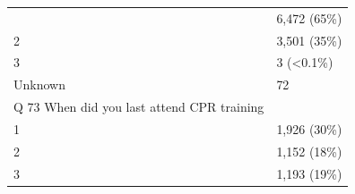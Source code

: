 \documentclass[]{article}
\begin{document}
\begin{longtable}[]{@{}ll@{}}
\begin{minipage}[t]{0.71\columnwidth}
\end{minipage} & \begin{minipage}[t]{0.23\columnwidth}\raggedright
6,472 (65\%)\strut
\end{minipage}\tabularnewline
\begin{minipage}[t]{0.71\columnwidth}\raggedright
2\strut
\end{minipage} & \begin{minipage}[t]{0.23\columnwidth}\raggedright
3,501 (35\%)\strut
\end{minipage}\tabularnewline
\begin{minipage}[t]{0.71\columnwidth}\raggedright
3\strut
\end{minipage} & \begin{minipage}[t]{0.23\columnwidth}\raggedright
3 (\textless0.1\%)\strut
\end{minipage}\tabularnewline
\begin{minipage}[t]{0.71\columnwidth}\raggedright
Unknown\strut
\end{minipage} & \begin{minipage}[t]{0.23\columnwidth}\raggedright
72\strut
\end{minipage}\tabularnewline
\begin{minipage}[t]{0.71\columnwidth}\raggedright
Q 73 When did you last attend CPR training\strut
\end{minipage} & \begin{minipage}[t]{0.23\columnwidth}\raggedright
\strut
\end{minipage}\tabularnewline
\begin{minipage}[t]{0.71\columnwidth}\raggedright
1\strut
\end{minipage} & \begin{minipage}[t]{0.23\columnwidth}\raggedright
1,926 (30\%)\strut
\end{minipage}\tabularnewline
\begin{minipage}[t]{0.71\columnwidth}\raggedright
2\strut
\end{minipage} & \begin{minipage}[t]{0.23\columnwidth}\raggedright
1,152 (18\%)\strut
\end{minipage}\tabularnewline
\begin{minipage}[t]{0.71\columnwidth}\raggedright
3\strut
\end{minipage} & \begin{minipage}[t]{0.23\columnwidth}\raggedright
1,193 (19\%)\strut
\end{minipage}\tabularnewline

\end{longtable}
\end{document}

